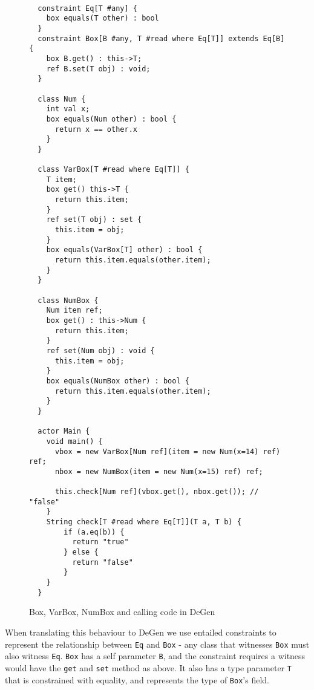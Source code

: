 \newpage

\begin{figure}[H]
    \centering
    \begin{verbatim}
    
  constraint Eq[T #any] {
    box equals(T other) : bool
  }    
  constraint Box[B #any, T #read where Eq[T]] extends Eq[B] {
    box B.get() : this->T;
    ref B.set(T obj) : void;
  }
  
  class Num {
    int val x;
    box equals(Num other) : bool {
      return x == other.x
    }
  }
 
  class VarBox[T #read where Eq[T]] {
    T item;
    box get() this->T {
      return this.item;
    }
    ref set(T obj) : set {
      this.item = obj;
    }
    box equals(VarBox[T] other) : bool {
      return this.item.equals(other.item);
    }
  }
    
  class NumBox {
    Num item ref;
    box get() : this->Num {
      return this.item;
    }
    ref set(Num obj) : void {
      this.item = obj;
    }
    box equals(NumBox other) : bool {
      return this.item.equals(other.item);
    }
  }
  
  actor Main {
    void main() {
      vbox = new VarBox[Num ref](item = new Num(x=14) ref) ref;
      nbox = new NumBox(item = new Num(x=15) ref) ref;
    
      this.check[Num ref](vbox.get(), nbox.get()); // "false"
    }
    String check[T #read where Eq[T]](T a, T b) {
        if (a.eq(b)) {
          return "true"
        } else {
          return "false"
        }
    }
  }
    \end{verbatim}
    \caption{Box, VarBox, NumBox and calling code in DeGen}
    \label{fig:degen-varbox}
\end{figure}

When translating this behaviour to DeGen we use entailed constraints to represent the relationship between \texttt{Eq} and \texttt{Box} - any class that witnesses \texttt{Box} must also witness \texttt{Eq}. \texttt{Box} has a self parameter \texttt{B}, and the constraint requires a witness would have the \texttt{get} and \texttt{set} method as above. It also has a type parameter \texttt{T} that is constrained with equality, and represents the type of \texttt{Box}'s field. \\

